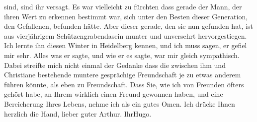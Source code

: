 \begin{ledgroupsized}[t]{13cm}
               sind, sind ihr versagt. Es war vielleicht zu fürchten dass gerade der Mann, der ihren
               Wert zu erkennen bestimmt war, sich unter den Besten dieser Generation, den
               Gefallenen, befunden hätte. Aber dieser gerade, den sie nun gefunden hat, ist aus vierjährigem
               Schützengrabendasein munter und unversehrt hervorgestiegen.\pend
           \pstart
           Ich lernte ihn diesen Winter in Heidelberg kennen, und ich muss sagen, er gefiel mir sehr. Alles was er
               sagte, und wie er es sagte, war mir gleich sympathisch. Dabei streifte mich nicht
               einmal der Gedanke dass die {\pb}zwischen ihm und Christiane bestehende muntere
               gesprächige Freundschaft je zu etwas anderem führen könnte, als eben zu
               Freundschaft.\pend
           \pstart
           Dass Sie, wie ich von Freunden öfters gehört habe, an Ihrem \label{K_L02503_4v}\label{K_L02503_4h} wirklich einen Freund gewonnen
               haben, und eine Bereicherung Ihres Lebens, nehme ich als ein gutes Omen.\pend
           \pstart
           Ich drücke Ihnen herzlich die Hand, lieber guter Arthur.\pend
           \pstart Ihr\spacefill\mbox{Hugo.}\pend{}
         
         \endnumbering{}\end{ledgroupsized}  \newcommand{\dateiname}{L02503}\newcommand{\titel}{Hugo Hofmannsthal an Arthur Schnitzler, 10. 7. [1928]}\newcommand{\editorInnen}{Martin Anton Müller und Gerd-Hermann Susen}
      